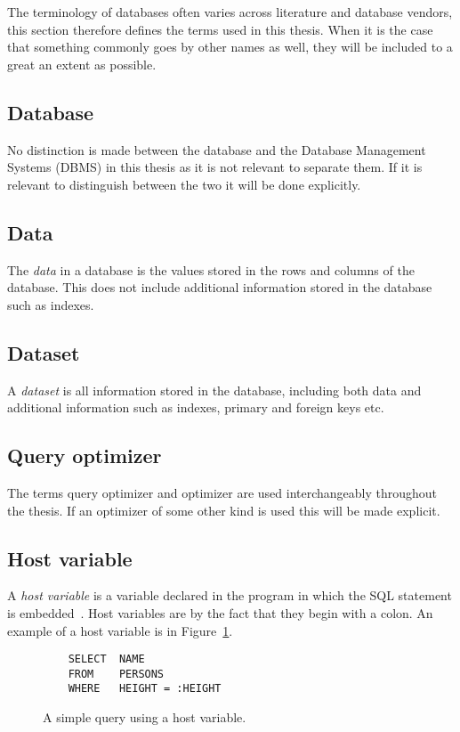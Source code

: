 The terminology of databases often varies across literature and database
vendors, this section therefore defines the terms used in this thesis. When
it is the case that something commonly goes by other names as well, they will be
included to a great an extent as possible.

\subsection*{Database}
No distinction is made between the database and the Database Management Systems
(DBMS) in this thesis as it is not relevant to separate them. If it is relevant
to distinguish between the two it will be done explicitly.

\subsection*{Data}
The \textit{data} in a database is the values stored in the rows and columns of
the database. This does not include additional information stored in the
database such as indexes.

\subsection*{Dataset}
A \textit{dataset} is all information stored in the database, including both
data and additional information such as indexes, primary and foreign keys etc.

\subsection*{Query optimizer}
The terms query optimizer and optimizer are used interchangeably throughout the
thesis. If an optimizer of some other kind is used this will be made explicit.

\subsection*{Host variable}
A \textit{host variable} is a variable declared in the program in which the SQL
statement is embedded~\cite[p. 151]{chamberlin_1998_complete_acgtdud}. Host
variables are by the fact that they begin with a colon. An example of a host
variable is  in Figure~\ref{fig:sql:hostvar}.

\begin{figure}[ht]
  \begin{verbatim}
    SELECT  NAME
    FROM    PERSONS
    WHERE   HEIGHT = :HEIGHT
  \end{verbatim}
  \caption[A query with a host variable]{A simple query using a host
    variable.}\label{fig:sql:hostvar}
\end{figure}

